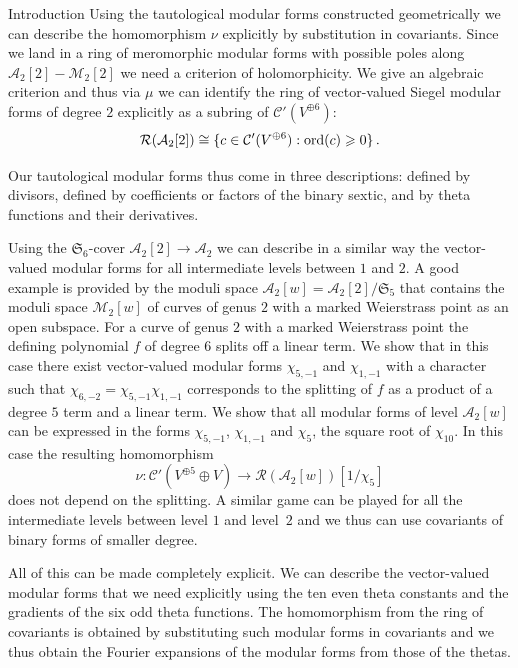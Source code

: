 \documentclass[12pt]{amsart}
\numberwithin{equation}{section}
\def\geq{\geqslant}
\numberwithin{equation}{section}
\theoremstyle{definition}
\theoremstyle{remark}
\begin{document}
\begin{section}{Introduction}
Using the tautological modular forms constructed geometrically we can describe the homomorphism $\nu$
explicitly by substitution in covariants. Since we land in a ring of meromorphic modular forms
with possible poles along $\mathcal{A}_2[2]-\mathcal{M}_2[2]$ we need a criterion of holomorphicity.
We give an algebraic criterion and thus via $\mu$ we can identify
the ring of vector-valued Siegel modular forms of degree $2$ 
explicitly as a subring of $\mathcal{C}'(V^{\oplus 6})$:
$$
\mathcal{R}(\mathcal{A}_2[2]) \cong \{ c \in \mathcal{C}'(V^{\oplus 6}): {\rm ord}(c)\geq 0 \}\, .
$$

Our tautological modular forms thus come in three descriptions: defined by divisors, 
defined by coefficients or factors of the binary sextic, and by theta functions and their derivatives.


\smallskip


Using the $\mathfrak{S}_6$-cover $\mathcal{A}_2[2] \to \mathcal{A}_2$ we can describe in a similar
way the vector-valued modular forms for all intermediate levels between $1$ and $2$.
A good example is provided by
the moduli space $\mathcal{A}_2[w]= \mathcal{A}_2[2]/\mathfrak{S}_5$ that
contains the moduli space $\mathcal{M}_2[w]$ of curves of genus $2$ with a marked Weierstrass 
point as an open subspace. For a curve of genus $2$ with a marked Weierstrass
point the defining polynomial $f$ of degree $6$ splits off a linear term.
We show that in this case there exist vector-valued modular forms $\chi_{5,-1}$ and $\chi_{1,-1}$
with a character such that $\chi_{6,-2}=\chi_{5,-1}\chi_{1,-1}$ corresponds to 
the splitting of $f$ as a product of a degree $5$ term and a linear term. We show that all 
modular forms of level $\mathcal{A}_2[w]$ can be expressed in the forms 
$\chi_{5,-1}$, $\chi_{1,-1}$ and $\chi_5$, the square root of $\chi_{10}$.
In this case the resulting homomorphism
$$
\nu: \mathcal{C}'(V^{\oplus 5} \oplus V) \to \mathcal{R}(\mathcal{A}_2[w])[1/\chi_5]
$$
does not depend on the splitting.
A similar game can be played for all the intermediate levels between level $1$
and level~$2$ and we thus can use covariants of binary forms of smaller degree.

All of this can be made completely explicit. We can describe the vector-valued 
modular forms that we need  explicitly using 
the ten even theta constants and the gradients of the six odd theta functions.
The homomorphism from the ring of covariants is obtained by substituting  such modular forms
in covariants and we thus obtain the Fourier
expansions of the modular forms from those of the thetas.


\end{section}
\end{document}
